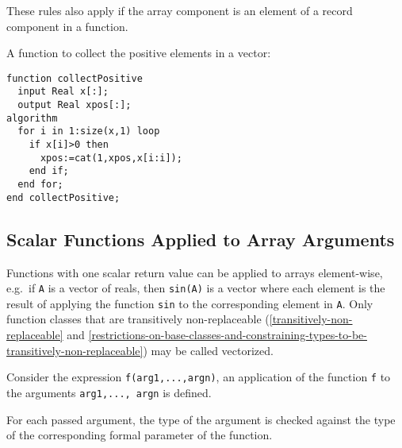These rules also apply if the array component is an element of a record
component in a function.

\begin{example}
A function to collect the positive elements in a vector:
\begin{lstlisting}[language=modelica]
function collectPositive
  input Real x[:];
  output Real xpos[:];
algorithm
  for i in 1:size(x,1) loop
    if x[i]>0 then
      xpos:=cat(1,xpos,x[i:i]);
    end if;
  end for;
end collectPositive;
\end{lstlisting}
\end{example}

\subsection{Scalar Functions Applied to Array Arguments}\label{scalar-functions-applied-to-array-arguments}

Functions with one scalar return value can be applied to arrays
element-wise, e.g.\ if \lstinline!A! is a vector of reals, then \lstinline!sin(A)! is a vector
where each element is the result of applying the function \lstinline!sin! to the
corresponding element in \lstinline!A!. Only function classes that are transitively
non-replaceable (\cref{transitively-non-replaceable} and \cref{restrictions-on-base-classes-and-constraining-types-to-be-transitively-non-replaceable}) may be called vectorized.

Consider the expression \lstinline!f(arg1,...,argn)!, an application of the function
\lstinline!f! to the arguments \lstinline!arg1,..., argn! is defined.

For each passed argument, the type of the argument is checked against
the type of the corresponding formal parameter of the function.

